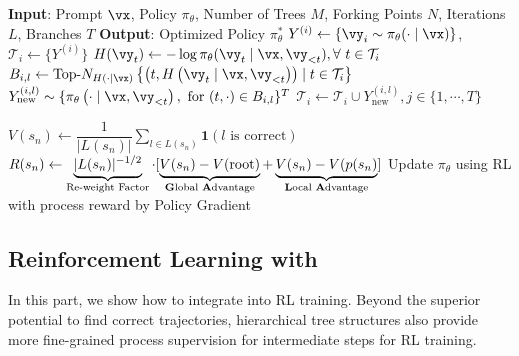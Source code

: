 \begin{algorithm*}[t]
    \caption{\model}
    \label{alg:entropy-guided-tree-search}
    \begin{algorithmic}{}
    \Statex \textbf{Input}: Prompt $\vx$, Policy $\pi_\theta$, Number of Trees $M$, Forking Points $N$, Iterations $L$, Branches $T$
    \Statex \textbf{Output}: Optimized Policy $\pi_{\theta}^*$
         
            \State $Y^{(i)} \leftarrow \{\vy_i \sim \pi_\theta(\cdot \mid \vx)\}$, $\mathcal{T}_i \leftarrow \{Y^{(i)}\}$ 
             \Comment{\textcolor{blue}{Iterative Expansion}}
                \State $H(\vy_t) \leftarrow -\log \pi_{\theta}(\vy_t \mid \vx, \vy_{<t}), \forall\ t \in \mathcal{T}_i$
                \State $B_{i, l} \leftarrow \text{Top-}N_{H(\cdot|\vx)}\left\{\left(t, H\left(\vy_t \mid \vx, \vy_{<t} \right)\right) \mid t \in \mathcal{T}_i\right\}$
                    \State $Y_{\text{new}}^{(i,l)} \sim \{\pi_\theta\left(\cdot \mid \vx, \vy_{<t}\right), \ \text{for} \ (t,\cdot) \in B_{i,l}\}^{T}$
                    \State $\mathcal{T}_i \leftarrow \mathcal{T}_i \cup Y_{\text{new}}^{(i,l)}, j\in \{1,\cdots, T\}$
                \EndFor
            \EndFor
        \EndFor
        
          \Comment{\textcolor{blue}{Process Reward Calculation}}
            \State $V(s_n) \leftarrow \dfrac{1}{|L(s_n)|} \sum_{l \in L(s_n)} \mathbf{1}(l \text{ is correct})$
            \State $R(s_n) \leftarrow \underbrace{|L(s_n)|^{-1/2}}_{\text{Re-weight Factor}}\cdot [\underbrace{V(s_n) - V(\text{root})}_{\text{\textbf{G}lobal \textbf{A}dvantage}} + \underbrace{V(s_n) - V(p(s_n)}_{\text{\textbf{L}ocal \textbf{A}dvantage}}]$
        \EndFor
    \State Update $\pi_{\theta}$ using RL with process reward by Policy Gradient
    \end{algorithmic}
\end{algorithm*}



\subsection{Reinforcement Learning with \treemodel}
In this part, we show how to integrate \treemodel into RL training.
Beyond the superior potential to find correct trajectories, hierarchical tree structures also provide more fine-grained process supervision for intermediate steps for RL training.


